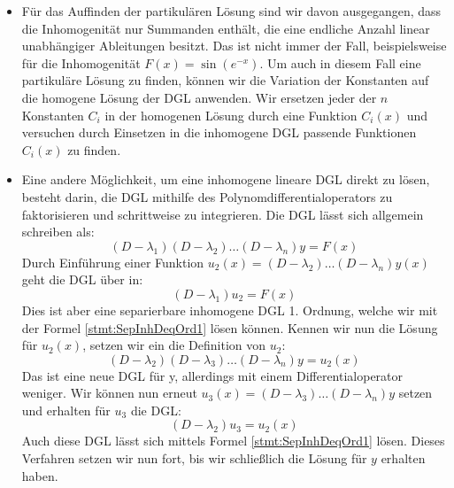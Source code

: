 \begin{itemize}
    \item Für das Auffinden der partikulären Lösung sind wir davon ausgegangen, dass die Inhomogenität nur Summanden enthält, die eine endliche Anzahl linear unabhängiger Ableitungen besitzt. Das ist nicht immer der Fall, beispielsweise für die Inhomogenität $F(x) = \sin(e^{-x})$. Um auch in diesem Fall eine partikuläre Lösung zu finden, können wir die Variation der Konstanten auf die homogene Lösung der DGL anwenden. Wir ersetzen jeder der $n$ Konstanten $C_i$ in der homogenen Lösung durch eine Funktion $C_i(x)$ und versuchen durch Einsetzen in die inhomogene DGL passende Funktionen $C_i(x)$ zu finden.
    \item Eine andere Möglichkeit, um eine inhomogene lineare DGL direkt zu lösen, besteht darin, die DGL mithilfe des Polynomdifferentialoperators zu faktorisieren und schrittweise zu integrieren. Die DGL lässt sich allgemein schreiben als:
    $$
        (D-\lambda_1) (D-\lambda_2) \dots (D-\lambda_n) y = F(x)
    $$
    Durch Einführung einer Funktion $u_2(x) = (D-\lambda_2) \dots (D-\lambda_n) y(x)$ geht die DGL über in:
    $$
        (D-\lambda_1) u_2 = F(x)
    $$
    Dies ist aber eine separierbare inhomogene DGL 1. Ordnung, welche wir mit der Formel \ref{stmt:SepInhDeqOrd1} lösen können. Kennen wir nun die Lösung für $u_2(x)$, setzen wir ein die Definition von $u_2$:
    $$
        (D-\lambda_2) (D-\lambda_3) \dots (D-\lambda_n) y = u_2(x)
    $$
    Das ist eine neue DGL für y, allerdings mit einem Differentialoperator weniger. Wir können nun erneut $u_3(x) = (D-\lambda_3) \dots (D-\lambda_n) y$ setzen und erhalten für $u_3$ die DGL:
    $$
        (D-\lambda_2) u_3 = u_2(x)
    $$
    Auch diese DGL lässt sich mittels Formel \ref{stmt:SepInhDeqOrd1} lösen. Dieses Verfahren setzen wir nun fort, bis wir schließlich die Lösung für $y$ erhalten haben.
\end{itemize}


